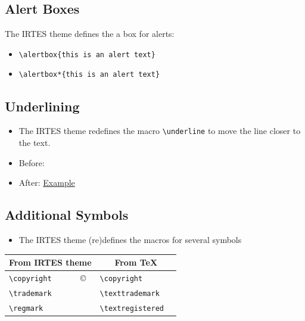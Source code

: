 \documentclass[english,circlenumberstyle]{irtesbeamer}
\begin{document}
\subsection{Alert Boxes}
\begin{frame}{\subsecname}
	The IRTES theme defines the a box for alerts: \\
	\begin{itemize}
	\item \texttt{{\textbackslash}alertbox\{this is an alert text\}} \\[.5cm]
		\vspace{1cm}
	\item \texttt{{\textbackslash}alertbox*\{this is an alert text\}} \\[.5cm]
	\end{itemize}
\end{frame}

\subsection{Underlining}

\makeatletter
\begin{frame}{\subsecname}
	\begin{itemize}
	\item The IRTES theme redefines the macro \texttt{{\textbackslash}underline} to move the line closer to the text.
	\item Before: 
	\item After: \underline{Example}
	\end{itemize}
\end{frame}
\makeatother

\subsection{Additional Symbols}
\begin{frame}{\subsecname}
	\begin{itemize}
	\item The IRTES theme (re)defines the macros for several symbols
	\end{itemize}
	\begin{tabularx}{\linewidth}{|l|X|l|X|}
	\hline
	\multicolumn{2}{|c|}{\textbf{From IRTES theme}} & \multicolumn{2}{c|}{\textbf{From \TeX}} \\
	\hline
	\texttt{{\textbackslash}copyright} & \copyright & \texttt{{\textbackslash}copyright} & \textcopyright \\
	\hline
	\texttt{{\textbackslash}trademark} & \trademark & \texttt{{\textbackslash}texttrademark} & \texttrademark \\
	\hline
	\texttt{{\textbackslash}regmark} & \regmark & \texttt{{\textbackslash}textregistered} & \textregistered \\
	\hline
	\end{tabularx}
\end{frame}
\end{document}
